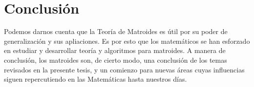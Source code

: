 \section{Conclusión}
Podemos darnos cuenta que la Teoría de Matroides es útil por su poder de generalización y sus apliaciones. Es por esto que los matemáticos se han esforzado en estudiar y desarrollar teoría y algoritmos para matroides. A manera de conclusión, los matroides son, de cierto modo, una conclusión de los temas revisados en la presente tesis, y un comienzo para nuevas áreas cuyas influencias siguen repercutiendo en las Matemáticas hasta nuestros días.